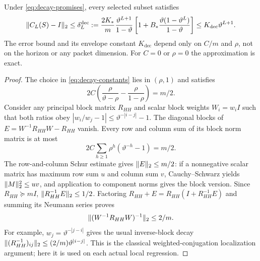 \begin{theorem}
\label{thm:general-decay}
Under \eqref{eq:decay-promises}, every selected subset satisfies
\begin{equation}
 \lVert C_L(S)-I\rVert_2\le\delta_L^{\mathrm{dec}}:=
 \frac{2K_*}{m}\frac{\vartheta^{L+1}}{1-\vartheta}
 \left[1+B_*\frac{\vartheta(1-\vartheta^L)}{1-\vartheta}\right]
 \le K_{\mathrm{dec}}\vartheta^{L+1}.
 \label{eq:decay-delta}
\end{equation}
The error bound and its envelope constant $K_{\mathrm{dec}}$ depend only
on $C/m$ and $\rho$, not on the horizon or any packet dimension.
For $C=0$ or $\rho=0$ the approximation is exact.
\end{theorem}
\begin{proof}
The choice in \eqref{eq:decay-constants} lies in $(\rho,1)$ and satisfies
\begin{equation}
 2C\left(\frac{\rho}{\vartheta-\rho}-\frac{\rho}{1-\rho}\right)=m/2.
 \label{eq:weighted-smallness}
\end{equation}
Consider any principal block matrix $R_{HH}$ and scalar block weights
$W_i=w_iI$ such that both ratios obey
$|w_i/w_j-1|\le\vartheta^{-|i-j|}-1$.
The diagonal blocks of
$E=W^{-1}R_{HH}W-R_{HH}$ vanish. Every row and column sum of its block
norm matrix is at most
\[
 2C\sum_{h\ge1}\rho^h(\vartheta^{-h}-1)=m/2.
\]
The row-and-column Schur estimate gives $\lVert E\rVert_2\le m/2$:
if a nonnegative scalar matrix has maximum row sum $u$ and column sum $v$,
Cauchy--Schwarz yields $\lVert M\rVert_2^2\le uv$, and application to component
norms gives the block version. Since $R_{HH}\succeq mI$,
$\lVert R_{HH}^{-1}E\rVert_2\le1/2$. Factoring
$R_{HH}+E=R_{HH}(I+R_{HH}^{-1}E)$ and summing its Neumann series proves
\begin{equation}
 \lVert(W^{-1}R_{HH}W)^{-1}\rVert_2\le2/m.
 \label{eq:conjugated-inverse}
\end{equation}
For example, $w_j=\vartheta^{-|j-i|}$ gives the usual inverse-block decay
$\lVert(R_{HH}^{-1})_{ij}\rVert_2\le(2/m)\vartheta^{|i-j|}$.
This is the classical weighted-conjugation localization argument; here it
is used on each actual local regression.


\end{proof}
